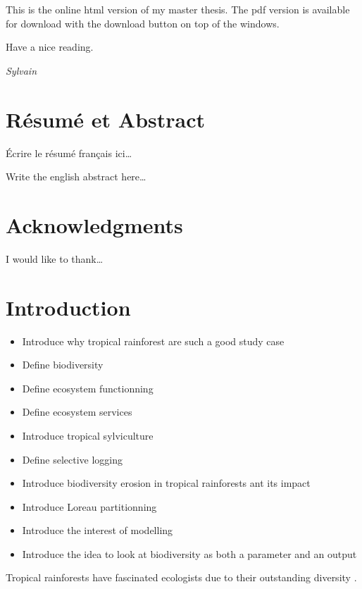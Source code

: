 \documentclass[]{article}
\providecommand{\tightlist}{%
  \setlength{\itemsep}{0pt}\setlength{\parskip}{0pt}}
\begin{document}
This is the online html version of my master thesis. The pdf version is
available for download with the download button on top of the windows.

Have a nice reading.

\emph{Sylvain}

\section*{Résumé et Abstract}\label{resume-et-abstract}

Écrire le résumé français ici\ldots{}

Write the english abstract here\ldots{}

\section*{Acknowledgments}\label{acknowledgments}

I would like to thank\ldots{}

\section*{Introduction}\label{introduction}

\begin{itemize}
\tightlist
\item
  Introduce why tropical rainforest are such a good study case
\item
  Define biodiversity
\item
  Define ecosystem functionning
\item
  Define ecosystem services
\item
  Introduce tropical sylviculture
\item
  Define selective logging
\item
  Introduce biodiversity erosion in tropical rainforests ant its impact
\item
  Introduce Loreau partitionning
\item
  Introduce the interest of modelling
\item
  Introduce the idea to look at biodiversity as both a parameter and an
  output
\end{itemize}

Tropical rainforests have fascinated ecologists due to their outstanding
diversity \citep{connell_diversity_1978}.
\end{document}
